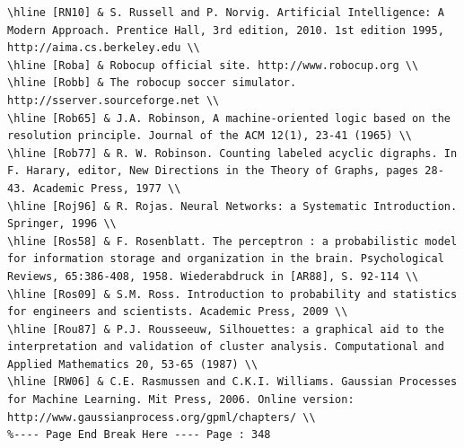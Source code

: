 \documentclass[10pt]{book}
\begin{document}
\begin{center}
\begin{enumerate}
\begin{center}
\begin{center}
\begin{center}
\begin{center}
\begin{center}
\begin{verbatim}
\hline [RN10] & S. Russell and P. Norvig. Artificial Intelligence: A Modern Approach. Prentice Hall, 3rd edition, 2010. 1st edition 1995, http://aima.cs.berkeley.edu \\
\hline [Roba] & Robocup official site. http://www.robocup.org \\
\hline [Robb] & The robocup soccer simulator. http://sserver.sourceforge.net \\
\hline [Rob65] & J.A. Robinson, A machine-oriented logic based on the resolution principle. Journal of the ACM 12(1), 23-41 (1965) \\
\hline [Rob77] & R. W. Robinson. Counting labeled acyclic digraphs. In F. Harary, editor, New Directions in the Theory of Graphs, pages 28-43. Academic Press, 1977 \\
\hline [Roj96] & R. Rojas. Neural Networks: a Systematic Introduction. Springer, 1996 \\
\hline [Ros58] & F. Rosenblatt. The perceptron : a probabilistic model for information storage and organization in the brain. Psychological Reviews, 65:386-408, 1958. Wiederabdruck in [AR88], S. 92-114 \\
\hline [Ros09] & S.M. Ross. Introduction to probability and statistics for engineers and scientists. Academic Press, 2009 \\
\hline [Rou87] & P.J. Rousseeuw, Silhouettes: a graphical aid to the interpretation and validation of cluster analysis. Computational and Applied Mathematics 20, 53-65 (1987) \\
\hline [RW06] & C.E. Rasmussen and C.K.I. Williams. Gaussian Processes for Machine Learning. Mit Press, 2006. Online version: http://www.gaussianprocess.org/gpml/chapters/ \\
%---- Page End Break Here ---- Page : 348


\end{verbatim}
\end{center}
\end{center}
\end{center}
\end{center}
\end{center}
\end{enumerate}
\end{center}
\end{document}
